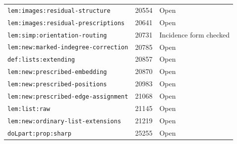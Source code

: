 \begin{tabular}{lll}
\nolinkurl{lem:images:residual-structure} & 20554 & Open \\
\nolinkurl{lem:images:residual-prescriptions} & 20641 & Open \\
\nolinkurl{lem:simp:orientation-routing} & 20731 & Incidence form checked \\
\nolinkurl{lem:new:marked-indegree-correction} & 20785 & Open \\
\nolinkurl{def:lists:extending} & 20857 & Open \\
\nolinkurl{lem:new:prescribed-embedding} & 20870 & Open \\
\nolinkurl{lem:new:prescribed-positions} & 20983 & Open \\
\nolinkurl{lem:new:prescribed-edge-assignment} & 21068 & Open \\
\nolinkurl{lem:list:raw} & 21145 & Open \\
\nolinkurl{lem:new:ordinary-list-extensions} & 21219 & Open \\
\nolinkurl{doLpart:prop:sharp} & 25255 & Open \\
\bottomrule\end{tabular}
